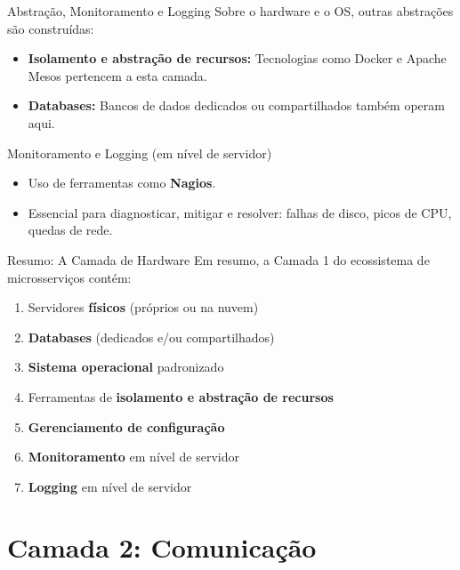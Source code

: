 \documentclass[aspectratio=169]{beamer}
\begin{document}
\begin{frame}{Abstração, Monitoramento e Logging}
    Sobre o hardware e o OS, outras abstrações são construídas:
    \vspace{0.3cm}
    \begin{itemize}
        \item \textbf{Isolamento e abstração de recursos:} Tecnologias como Docker e Apache Mesos pertencem a esta camada.
        \item \textbf{Databases:} Bancos de dados dedicados ou compartilhados também operam aqui.
    \end{itemize}
    \vspace{0.3cm}
    \begin{block}{Monitoramento e Logging (em nível de servidor)}
        \begin{itemize}
            \item Uso de ferramentas como \textbf{Nagios}.
            \item Essencial para diagnosticar, mitigar e resolver: falhas de disco, picos de CPU, quedas de rede.
        \end{itemize}
    \end{block}
\end{frame}

\begin{frame}{Resumo: A Camada de Hardware}
    Em resumo, a Camada 1 do ecossistema de microsserviços contém:
    \vspace{0.3cm}
    \begin{enumerate}
        \item Servidores \textbf{físicos} (próprios ou na nuvem)
        \item \textbf{Databases} (dedicados e/ou compartilhados)
        \item \textbf{Sistema operacional} padronizado
        \item Ferramentas de \textbf{isolamento e abstração de recursos}
        \item \textbf{Gerenciamento de configuração}
        \item \textbf{Monitoramento} em nível de servidor
        \item \textbf{Logging} em nível de servidor
    \end{enumerate}
\end{frame}

\section{Camada 2: Comunicação}
\end{document}
